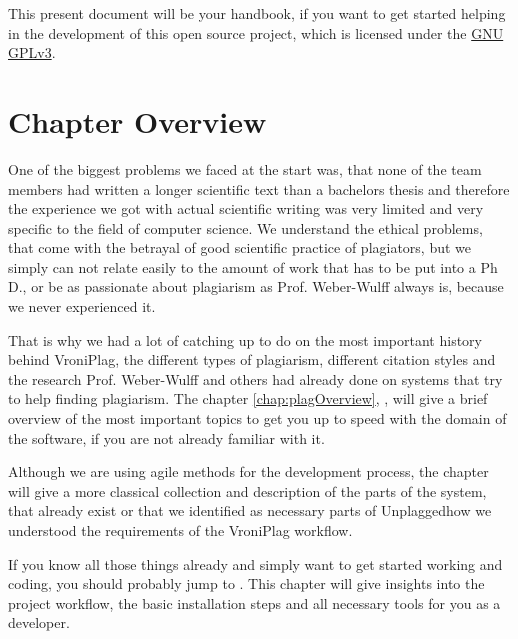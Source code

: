 This present document will be your handbook, if you want to get started helping in the development of this 
open source project, which is licensed under the \href{http://www.gnu.org/licenses/quick-guide-gplv3}{GNU GPLv3}.

\section{Chapter Overview}

One of the biggest problems we faced at the start was, that none of the team members had written a longer scientific
text than a bachelors
thesis and therefore the experience we got with actual scientific writing was very limited and very specific to the 
field of computer science. We understand the ethical problems, that come with the betrayal of 
good scientific practice of plagiators, but we simply can not relate easily to the amount of work that has to be put into 
a Ph D., or be as 
passionate about plagiarism as Prof. Weber-Wulff always is, because we never experienced it.

That is why we had a lot of catching up to do on the most important history behind VroniPlag, the different types
of plagiarism, different citation styles and the research Prof. Weber-Wulff and others had already done on systems that try to 
help finding plagiarism. The chapter \ref{chap:plagOverview}, , will
give a brief overview of the most important topics to get you up to speed with the domain of the software, if you are
not already familiar with it.

Although we are using agile methods for the development process, the chapter  will give
a more classical collection and description of the parts of the system, that already exist or that we identified as 
necessary parts of Unplaggedhow we understood the requirements of the 
VroniPlag workflow.

If you know all those things already and simply want to get started working and coding, you should probably jump
to . This chapter will give insights into the project workflow, the basic installation
steps and all necessary tools for you as a developer.

